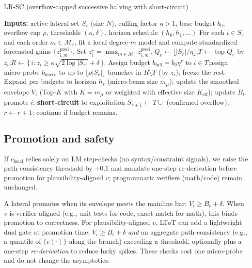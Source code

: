 \documentclass{article}
\begin{document}
\begin{algorithm}[t]
\caption{LR-SC (overflow-capped successive halving with short-circuit)}
\label{alg:lrscr}
\begin{algorithmic}[1]
\State \textbf{Inputs:} active lateral set $S_r$ (size $N$), culling factor $\eta>1$, base budget $b_0$, overflow cap $\rho$, thresholds $(\kappa,\delta)$, horizon schedule $(h_0,h_1,\dots)$
\State For each $i\in S_r$ and each order $m\in\mathcal{M}_r$, fit a local degree-$m$ model and compute standardized forecasted gains $\{z^{\mathrm{pred}}_{i,m}\}$. Set $z_i^{\star}=\max_{m\in\mathcal{M}_r} z^{\mathrm{pred}}_{i,m}$.
\State $Q_r \leftarrow \lfloor |S_r|/\eta \rfloor$;\quad $T \leftarrow$ top $Q_r$ by $z_i$;\quad $R \leftarrow \{\,i : z_i \ge \kappa \sqrt{2\log |S_r|} + \delta\,\}$.
\State Assign budget $b_{\text{full}} = b_0 \eta^r$ to $i\in T$;\quad assign micro-probe $b_{\text{micro}}$ to up to $\lfloor \rho |S_r|\rfloor$ branches in $R\setminus T$ (by $z_i$); freeze the rest.
\State Expand per budgets to horizon $h_r$ (micro-beam size $m_{\mu}$); update the smoothed envelope $\tilde V_i$ (Top-$K$ with $K{=}m_{\mu}$ or weighted with effective size $K_{\mathrm{eff}}$); update $B_t$.
  \State promote $i$; \textbf{short-circuit} to exploitation
\EndIf
\State $S_{r+1} \leftarrow T \cup$ (confirmed overflow); $r\leftarrow r+1$; continue if budget remains.
\end{algorithmic}
\end{algorithm}

\vspace{-0.5em}
\subsection{Promotion and safety}
\label{sec:promotion}
If $c_{\text{local}}$ relies solely on LM step-checks (no syntax/constraint signals), we raise the path-consistency threshold by $+0.1$
and mandate one-step re-derivation before promotion for plausibility-aligned $v$; programmatic verifiers (math/code) remain unchanged.

A lateral promotes when its envelope meets the mainline bar: $V_i \ge B_t+\delta$.
When $v$ is verifier-aligned (e.g., unit tests for code, exact-match for math), this binds promotion to correctness.
For plausibility-aligned $v$, LToT can add a lightweight dual gate at promotion time:
$V_i\!\ge\!B_t{+}\delta$ \emph{and} an aggregate path-consistency (e.g., a quantile of $\{c(\cdot)\}$ along the branch) exceeding a threshold, optionally plus a one-step \emph{re-derivation} to reduce lucky spikes.
These checks cost one micro-probe and do not change the asymptotics.
\end{document}
